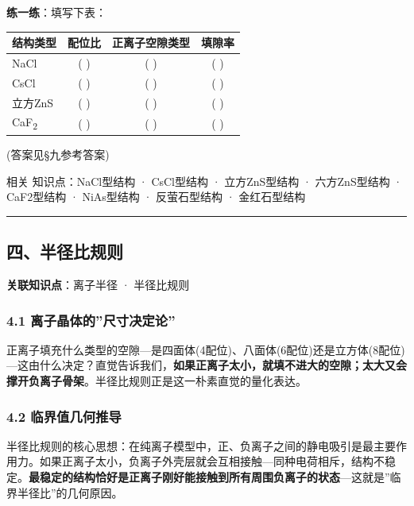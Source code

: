 \documentclass[a4paper,11pt]{ctexart}
\newcounter{none}
\newcommand{\箭}{\ensuremath{\rightarrow}}
\newcommand{\左箭}{\ensuremath{\leftarrow}}
\newcommand{\上箭}{\ensuremath{\uparrow}}
\newcommand{\下箭}{\ensuremath{\downarrow}}
\newcommand{\衡}{\ensuremath{\rightleftharpoons}}
\newcommand{\双箭}{\ensuremath{\leftrightarrow}}
\newcommand{\约等于}{\ensuremath{\approx}}
\newcommand{\小于等于}{\ensuremath{\leq}}
\newcommand{\大于等于}{\ensuremath{\geq}}
\newcommand{\不等于}{\ensuremath{\neq}}
\newcommand{\西格马}{\ensuremath{\sigma}}
\newcommand{\派}{\ensuremath{\pi}}
\begin{document}
\textbf{练一练}：填写下表：

{\def\LTcaptype{none} %
\begin{longtable}[]{@{}lccc@{}}
\toprule\noalign{}
结构类型 & 配位比 & 正离子空隙类型 & 填隙率 \\
\midrule\noalign{}
\endhead
\bottomrule\noalign{}
\endlastfoot
NaCl & ( ) & ( ) & ( ) \\
CsCl & ( ) & ( ) & ( ) \\
立方ZnS & ( ) & ( ) & ( ) \\
CaF\textsubscript{2} & ( ) & ( ) & ( ) \\
\end{longtable}
}

(答案见§九参考答案)

相关 知识点：NaCl型结构 · CsCl型结构 · 立方ZnS型结构 · 六方ZnS型结构 · CaF2型结构 · NiAs型结构 · 反萤石型结构 · 金红石型结构

\begin{center}\rule{0.5\linewidth}{0.5pt}\end{center}

\subsection{四、半径比规则}\label{ux56dbux534aux5f84ux6bd4ux89c4ux5219}

\textbf{关联知识点}：离子半径 · 半径比规则

\subsubsection{4.1 离子晶体的''尺寸决定论''}\label{ux79bbux5b50ux6676ux4f53ux7684ux5c3aux5bf8ux51b3ux5b9aux8bba}

正离子填充什么类型的空隙---是四面体(4配位)、八面体(6配位)还是立方体(8配位)---这由什么决定？直觉告诉我们，\textbf{如果正离子太小，就填不进大的空隙；太大又会撑开负离子骨架}。半径比规则正是这一朴素直觉的量化表达。

\subsubsection{4.2 临界值几何推导}\label{ux4e34ux754cux503cux51e0ux4f55ux63a8ux5bfc}

半径比规则的核心思想：在纯离子模型中，正、负离子之间的静电吸引是最主要作用力。如果正离子太小，负离子外壳层就会互相接触---同种电荷相斥，结构不稳定。\textbf{最稳定的结构恰好是正离子刚好能接触到所有周围负离子的状态}---这就是''临界半径比''的几何原因。
\end{document}
